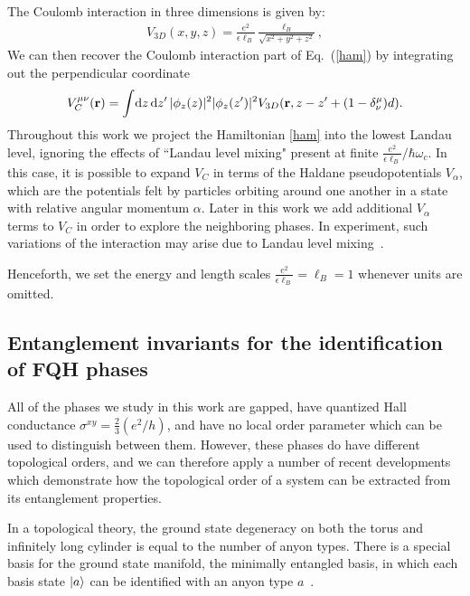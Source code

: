 The Coulomb interaction in three dimensions is given by:
\begin{align}
	V_{3D}(x,y,z)=\frac{e^2}{\epsilon \ell_B}\frac{\ell_B}{\sqrt{x^2+y^2+z^2}},
\end{align}
We can then recover the Coulomb interaction part of Eq.~(\ref{ham}) by integrating out the perpendicular coordinate
\begin{equation}
	V_C^{\mu\nu}({\mathbf{r}})=\int\! \mathrm{d} z \, \mathrm{d} z^\prime \, |\phi_z(z)|^2 |\phi_z(z^\prime)|^2
	\\ V_{3D}({\mathbf{r}},z - z^\prime +  (1-\delta^\mu_\nu) d) .
\end{equation}
Throughout this work we project the Hamiltonian \eqref{ham} into the lowest Landau level,  ignoring the effects of ``Landau level mixing"  present at finite $ \frac{e^2}{\epsilon\ell_B} / \hbar \omega_c$.
In this case, it is possible to expand $V_C$ in terms of the Haldane pseudopotentials $V_\alpha$, which are the potentials felt by particles orbiting around one another in a state with relative angular momentum $\alpha$.
Later in this work we add additional $V_\alpha$ terms to $V_C$ in order to explore the neighboring phases.
In experiment, such variations of the interaction may arise due to Landau level mixing~\cite{BisharaNayakMixing, WojsMixing, RezayiSimonMixing, Papic12, SodemannMixing, PetersonMixing, SimonRezayiMixing, ZaletelMixing, PakrouskiMixing}.

Henceforth, we set the energy and length scales $\frac{e^2}{\epsilon\ell_B} = \ell_B = 1$ whenever units are omitted.



\subsection{Entanglement invariants for the identification of FQH phases}
\label{sec:ent_sig}

All of the phases we study in this work are gapped,  have quantized Hall conductance $\sigma^{xy} = \frac23 (e^2/h)$, and  have no local order parameter which can be used to distinguish between them.
However, these phases do have different topological orders, and we can therefore apply a number of recent developments~\cite{Zhang2012,Cincio2013,ZaletelQHdmrg13,HHTuMomPol13} which demonstrate how the topological order of a system can be extracted from its entanglement properties.

In a topological theory, the ground state degeneracy on both the torus and infinitely long cylinder is equal to the number of anyon types.
There is a special basis for the ground state manifold, the minimally entangled basis, in which each basis state $\ket{a}$ can be identified with an anyon type $a$~\cite{KitaevPreskill, LiHaldane, Zhang2012}.

